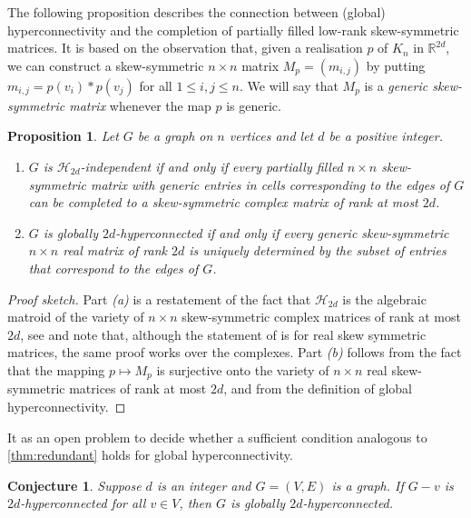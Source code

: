 \documentclass[11pt,a4paper,dvipsnames]{scrartcl}
\newtheorem{proposition}[theorem]{Proposition}
\newtheorem{conjecture}[theorem]{Conjecture}
\newcommand{\R}{{\mathbb{R}}}
\begin{document}
The following proposition describes the connection between (global) hyperconnectivity and the completion of partially filled low-rank skew-symmetric matrices. It is based on the observation that, given a realisation $p$ of $K_n$ in $\R^{2d}$, we can construct a skew-symmetric $n\times n$  matrix $M_p=(m_{i,j})$ by putting $m_{i,j}=p(v_i)*p(v_j)$ for all $1\leq i,j\leq n$. We will say that $M_p$ is a {\em generic skew-symmetric matrix} whenever the map $p$ is generic.

\begin{proposition}
    Let $G$ be a graph on $n$ vertices and let $d$ be a positive integer.
    \begin{enumerate}
        \item $G$ is $\mathcal{H}_{2d}$-independent if and only if 
        every partially filled $n \times n$ skew-symmetric matrix with generic entries in cells corresponding to the edges of $G$   can be completed to a skew-symmetric complex matrix of rank at most $2d$.
        \item $G$ is globally $2d$-hyperconnected if and only if 
        every generic  skew-symmetric $n\times n$ real matrix of rank $2d$ is uniquely determined by the subset of entries that correspond to the edges of $G$.
    \end{enumerate}
\end{proposition}
\begin{proof}[Proof sketch]
    Part \emph{(a)} is a restatement of the fact that $\mathcal{H}_{2d}$ is the algebraic matroid of the variety of $n \times n$ skew-symmetric complex matrices of rank at most $2d$, see \cite[Proposition 3.1]{RS} and note that, although  the statement of \cite[Proposition 3.1]{RS} is for real skew symmetric matrices,  the same proof works over the complexes. Part \emph{(b)} follows from the fact that 
    the mapping $p \mapsto M_p$ is surjective onto the variety of $n \times n$ real skew-symmetric matrices of rank at most $2d$, and
    from the definition of global hyperconnectivity. 
\end{proof}


It as an open problem to decide whether a sufficient condition analogous to \cref{thm:redundant} holds for global hyperconnectivity. 

\begin{conjecture}\label{conj:globalhyperconnected}
    Suppose $d$ is an integer and $G = (V,E)$ is a graph. If $G-v$ is $2d$-hyperconnected for all $v \in V$, then $G$ is globally $2d$-hyperconnected.
\end{conjecture}
\end{document}
